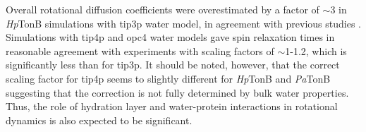 \documentclass[pre,aps,floatfix,authordate1-4,twocolumn]{revtex4-1}
\begin{document}

Overall rotational diffusion coefficients were overestimated by a factor of $\sim$3 in
{\it Hp}TonB simulations with tip3p water model, in agreement with previous
studies \cite{prompers02,wong08,anderson12}. Simulations with tip4p and opc4
water models gave spin relaxation times in reasonable agreement with experiments
with scaling factors of $\sim$1-1.2, which is significantly less than for tip3p.
It should be noted, however, that the correct scaling factor for tip4p seems to slightly
different for {\it Hp}TonB and {\it Pa}TonB suggesting that the correction
is not fully determined by bulk water properties. Thus, the role of hydration layer
and water-protein interactions in rotational dynamics is also expected to
be significant.







\end{document}
